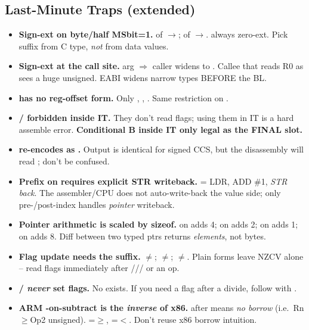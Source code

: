 \subsection{Last-Minute Traps (extended)}
\begin{itemize}
\item \textbf{Sign-ext on byte/half MSbit=1.}  of $\to$;  of $\to$.  always zero-ext. Pick suffix from C type, \emph{not} from data values.
\item \textbf{Sign-ext at the call site.}  arg $\Rightarrow$ caller widens to . Callee that reads R0 as  sees a huge unsigned. EABI widens narrow types BEFORE the BL.
\item \textbf{ has no reg-offset form.} Only \asm{[Ra,\#k]}, \asm{[Ra,\#k]!}, . Same restriction on .
\item \textbf{/ forbidden inside IT.} They don't read flags; using them in IT is a hard assemble error. \textbf{Conditional B inside IT only legal as the FINAL slot.}
\item \textbf{ re-encodes as .} Output is identical for signed CCS, but the disassembly will read ; don't be confused.
\item \textbf{Prefix \asm{++} on  requires explicit STR writeback.}  = LDR, ADD \#1, \emph{STR back}. The assembler/CPU does not auto-write-back the value side; only pre-/post-index handles \emph{pointer} writeback.
\item \textbf{Pointer arithmetic is scaled by sizeof.}  on  adds 4; on  adds 2; on  adds 1; on  adds 8. Diff between two typed ptrs returns \emph{elements}, not bytes.
\item \textbf{Flag update needs the  suffix.} $\ne$; $\ne$; $\ne$. Plain forms leave NZCV alone -- read flags immediately after /// or an  op.
\item \textbf{/ \emph{never} set flags.} No  exists. If you need a flag after a divide, follow with .
\item \textbf{ARM -on-subtract is the \emph{inverse} of x86.}  after  means \emph{no borrow} (i.e.\ Rn$\ge$Op2 unsigned). =$\ge$, =$<$. Don't reuse x86 borrow intuition.

\end{itemize}
